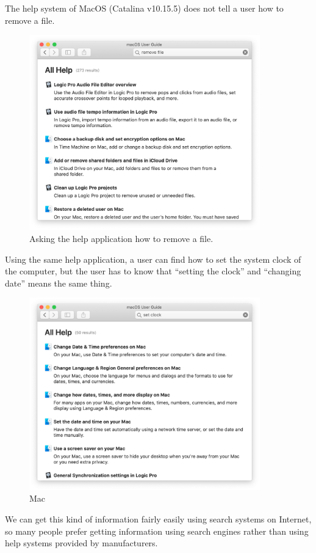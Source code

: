 \documentclass[manuscript,screen,review]{acmart}
\begin{document}
The help system of MacOS (Catalina v10.15.5) does not tell a user how to remove a file.

\begin{figure}[H]
  \centering
  \includegraphics[width=10cm,bb=0 0 1290 1090]{figures/eaa80e41ddc3d3620fae133007274573.png}
  \caption{Asking the help application how to remove a file.}
\end{figure}

Using the same help application, 
a user can find how to set the system clock of the computer,
but the user has to know that
``setting the clock'' and ``changing date'' means the same thing.

\begin{figure}[H]
  \centering
  \includegraphics[width=10cm,bb=0 0 1310 1090]{figures/0cd679128d8f69eb2a8a966d6466a8a4.png}
  \caption{Mac}
\end{figure}

We can get this kind of information fairly easily using search systems on Internet,
so many people prefer getting information using search engines rather than
using help systems provided by manufacturers.
\end{document}
